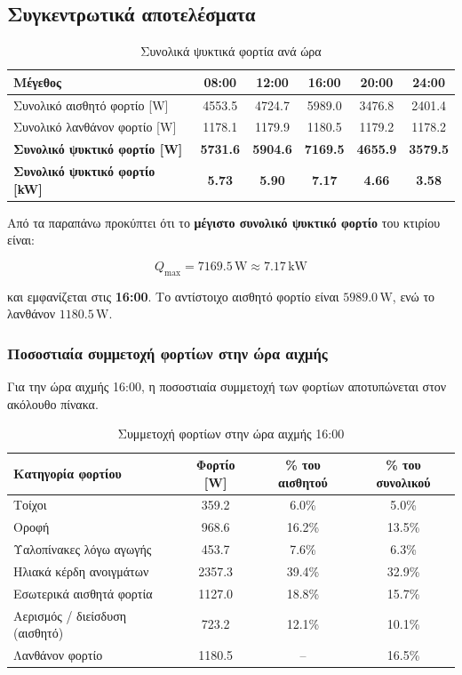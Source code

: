 \documentclass[12pt,a4paper]{article}
\begin{document}
\subsection{Συγκεντρωτικά αποτελέσματα}

\begin{table}[H]
\centering
\caption{Συνολικά ψυκτικά φορτία ανά ώρα}
\begin{tabular}{lccccc}
\toprule
\textbf{Μέγεθος} & \textbf{08:00} & \textbf{12:00} & \textbf{16:00} & \textbf{20:00} & \textbf{24:00} \\
\midrule
Συνολικό αισθητό φορτίο [W] & 4553.5 & 4724.7 & 5989.0 & 3476.8 & 2401.4 \\
Συνολικό λανθάνον φορτίο [W] & 1178.1 & 1179.9 & 1180.5 & 1179.2 & 1178.2 \\
\midrule
\textbf{Συνολικό ψυκτικό φορτίο [W]} & \textbf{5731.6} & \textbf{5904.6} & \textbf{7169.5} & \textbf{4655.9} & \textbf{3579.5} \\
\textbf{Συνολικό ψυκτικό φορτίο [kW]} & \textbf{5.73} & \textbf{5.90} & \textbf{7.17} & \textbf{4.66} & \textbf{3.58} \\
\bottomrule
\end{tabular}
\end{table}

Από τα παραπάνω προκύπτει ότι το \textbf{μέγιστο συνολικό ψυκτικό φορτίο} του κτιρίου
είναι:

\[
Q_{\max} = 7169.5\,\mathrm{W} \approx 7.17\,\mathrm{kW}
\]

και εμφανίζεται στις \textbf{16:00}. Το αντίστοιχο αισθητό φορτίο είναι
\(5989.0\,\mathrm{W}\), ενώ το λανθάνον \(1180.5\,\mathrm{W}\).

\subsubsection{Ποσοστιαία συμμετοχή φορτίων στην ώρα αιχμής}

Για την ώρα αιχμής 16:00, η ποσοστιαία συμμετοχή των φορτίων αποτυπώνεται στον
ακόλουθο πίνακα.

\begin{table}[H]
\centering
\caption{Συμμετοχή φορτίων στην ώρα αιχμής 16:00}
\begin{tabular}{lccc}
\toprule
\textbf{Κατηγορία φορτίου} & \textbf{Φορτίο [W]} & \textbf{\% του αισθητού} & \textbf{\% του συνολικού} \\
\midrule
Τοίχοι & 359.2 & 6.0\% & 5.0\% \\
Οροφή & 968.6 & 16.2\% & 13.5\% \\
Υαλοπίνακες λόγω αγωγής & 453.7 & 7.6\% & 6.3\% \\
Ηλιακά κέρδη ανοιγμάτων & 2357.3 & 39.4\% & 32.9\% \\
Εσωτερικά αισθητά φορτία & 1127.0 & 18.8\% & 15.7\% \\
Αερισμός / διείσδυση (αισθητό) & 723.2 & 12.1\% & 10.1\% \\
Λανθάνον φορτίο & 1180.5 & -- & 16.5\% \\
\bottomrule
\end{tabular}
\end{table}
\end{document}
